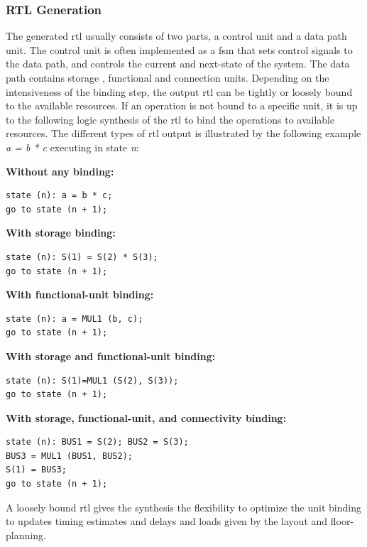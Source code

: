 \subsubsection{RTL Generation}
The generated \gls{rtl} usually consists of two parts, a control unit and a data path unit. The control unit is often implemented as a \gls{fsm} that sets control signals to the data path, and controls the current and next-state of the system. The data path contains storage , functional and connection units. Depending on the intensiveness of the binding step, the output \gls{rtl} can be tightly or loosely bound to the available resources. If an operation is not bound to a specific unit, it is up to the following logic synthesis of the \gls{rtl} to bind the operations to available resources. The different types of \gls{rtl} output is illustrated by the following example \textit{a = b * c} executing in state \textit{n}:\\
\begin{minipage}[t][270px]{\textwidth}
\textbf{Without any binding:}%
\begin{verbatim}
state (n): a = b * c;
go to state (n + 1);
\end{verbatim}
\textbf{With storage binding:}%
\begin{verbatim}
state (n): S(1) = S(2) * S(3);
go to state (n + 1);
\end{verbatim}
\textbf{With functional-unit binding:}%
\begin{verbatim}
state (n): a = MUL1 (b, c);
go to state (n + 1);
\end{verbatim}
\textbf{With storage and functional-unit binding:}%
\begin{verbatim}
state (n): S(1)=MUL1 (S(2), S(3));
go to state (n + 1);
\end{verbatim}
\textbf{With storage, functional-unit, and connectivity binding:}%
\begin{verbatim}
state (n): BUS1 = S(2); BUS2 = S(3);
BUS3 = MUL1 (BUS1, BUS2);
S(1) = BUS3;
go to state (n + 1);
\end{verbatim}
\end{minipage}
A loosely bound \gls{rtl} gives the synthesis the flexibility to optimize the unit binding to updates timing estimates and delays and loads given by the layout and floor-planning.
